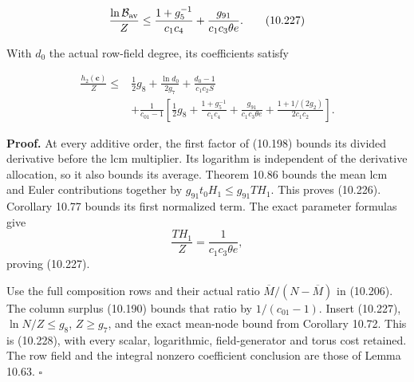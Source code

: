 \documentclass[
  11pt,
  a4paper,
]{article}
\begin{document}
\[
\frac{\ln\mathcal B_{\rm av}}Z
\le\frac{1+g_5^{-1}}{c_1c_4}
                    +\frac{g_{91}}{c_1c_3\theta e}.
\tag{10.227}
\]

With \(d_0\) the actual row-field degree, its coefficients satisfy

\[
\begin{aligned}
\frac{h_2(\boldsymbol c)}Z\le{}&
\frac12g_8+\frac{\ln d_0}{2g_7}
                         +\frac{d_0-1}{c_1c_2S}\\
&+\frac1{c_{01}-1}\left[
\frac12g_8+\frac{1+g_5^{-1}}{c_1c_4}
+\frac{g_{91}}{c_1c_3\theta e}
+\frac{1+1/(2g_2)}{2c_1c_2}\right].
\end{aligned}
\tag{10.228}
\]

\textbf{Proof.} At every additive order, the first factor of (10.198)
bounds its divided derivative before the lcm multiplier. Its logarithm
is independent of the derivative allocation, so it also bounds its
average. Theorem 10.86 bounds the mean lcm and Euler contributions
together by \(g_{91}t_0H_1\le g_{91}TH_1\). This proves (10.226).
Corollary 10.77 bounds its first normalized term. The exact parameter
formulas give \[
\frac{TH_1}{Z}=\frac1{c_1c_3\theta e},
\] proving (10.227).

Use the full composition rows and their actual ratio
\(\overline M/(N-\overline M)\) in (10.206). The column surplus (10.190)
bounds that ratio by \(1/(c_{01}-1)\). Insert (10.227),
\(\ln N/Z\le g_8\), \(Z\ge g_7\), and the exact mean-node bound from
Corollary 10.72. This is (10.228), with every scalar, logarithmic,
field-generator and torus cost retained. The row field and the integral
nonzero coefficient conclusion are those of Lemma 10.63. \(\square\)
\end{document}
